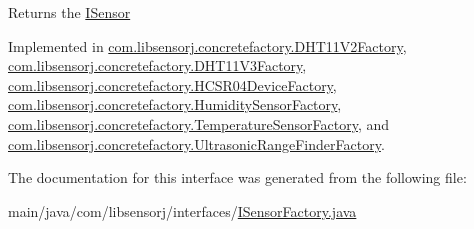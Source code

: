 \begin{DoxyReturn}{Returns}
the \hyperlink{interfacecom_1_1libsensorj_1_1interfaces_1_1ISensor}{I\+Sensor} 
\end{DoxyReturn}


Implemented in \hyperlink{classcom_1_1libsensorj_1_1concretefactory_1_1DHT11V2Factory_ac04eaebc748d420eb035439dfc1d2202}{com.\+libsensorj.\+concretefactory.\+D\+H\+T11\+V2\+Factory}, \hyperlink{classcom_1_1libsensorj_1_1concretefactory_1_1DHT11V3Factory_ad89c967025d654490729d2f69438805e}{com.\+libsensorj.\+concretefactory.\+D\+H\+T11\+V3\+Factory}, \hyperlink{classcom_1_1libsensorj_1_1concretefactory_1_1HCSR04DeviceFactory_a3d5c07b9ce458a3f56cfe5e7470b51df}{com.\+libsensorj.\+concretefactory.\+H\+C\+S\+R04\+Device\+Factory}, \hyperlink{classcom_1_1libsensorj_1_1concretefactory_1_1HumiditySensorFactory_aec6f80bd08e69d69ea6187067d11d28c}{com.\+libsensorj.\+concretefactory.\+Humidity\+Sensor\+Factory}, \hyperlink{classcom_1_1libsensorj_1_1concretefactory_1_1TemperatureSensorFactory_aeba8598ebe5c182154f63e0c94abdd70}{com.\+libsensorj.\+concretefactory.\+Temperature\+Sensor\+Factory}, and \hyperlink{classcom_1_1libsensorj_1_1concretefactory_1_1UltrasonicRangeFinderFactory_a3aa6e46ef47bf97355df4d5cfb1b1e01}{com.\+libsensorj.\+concretefactory.\+Ultrasonic\+Range\+Finder\+Factory}.



The documentation for this interface was generated from the following file\+:\begin{DoxyCompactItemize}
\item 
main/java/com/libsensorj/interfaces/\hyperlink{ISensorFactory_8java}{I\+Sensor\+Factory.\+java}\end{DoxyCompactItemize}
